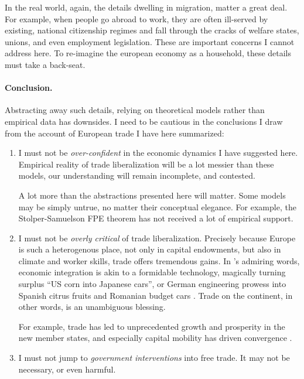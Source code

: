 \documentclass[11pt,a4paper,oneside]{article}
\begin{document}
In the real world, again, the details dwelling in migration, matter a great deal. 
For example, when people go abroad to work, they are often ill-served by existing, national citizenship regimes and fall through the cracks of welfare states, unions, and even employment legislation. 
These are important concerns I cannot address here. 
To re-imagine the european economy as a household, these details must take a back-seat.

\paragraph{Conclusion.} 
Abstracting away such details, relying on theoretical models rather than empirical data has downsides. 
I need to be cautious in the conclusions I draw from the account of European trade I have here summarized: 
\begin{enumerate}
	\item I must not be \emph{over-confident} in the economic dynamics I have suggested here. 
	Empirical reality of trade liberalization will be a lot messier than these models, our understanding will remain incomplete, and contested. 
	
	A lot more than the abstractions presented here will matter. 
	Some models may  be simply untrue, no matter their conceptual elegance. 
	For example, the Stolper-Samuelson \gls{FPE} theorem has not received a lot of empirical support. 
	
	\item I must not be \emph{overly critical} of trade liberalization. 
	Precisely because Europe is such a heterogenous place, not only in capital endowments, but also in climate and worker skills, trade offers tremendous gains. 
	In \citeauthor{Mankiw-2004-aa}'s admiring words, economic integration is akin to a formidable technology, magically turning surplus ``US corn into Japanese cars'', or German engineering prowess into Spanish citrus fruits and Romanian budget cars \citeyearpar[212]{Mankiw-2004-aa}. 
	Trade on the continent, in other words, is an unambiguous blessing. 
	
	For example, trade has led to unprecedented growth and prosperity in the new member states, and especially capital mobility has driven convergence \citep{Abiad2007}. %
	
	\item I must not jump to \emph{government interventions} into free trade. 
	It may not be necessary, or even harmful.
	

\end{enumerate}
\end{document}
